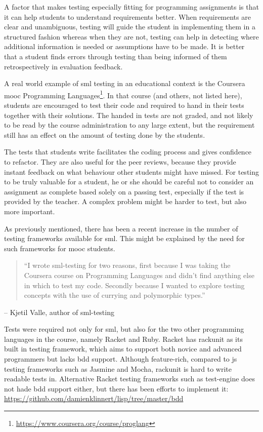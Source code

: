 \documentclass[11pt]{article}
\begin{document}
A factor that makes testing especially fitting for programming assignments is that it can help students to understand requirements better.
When requirements are clear and unambiguous, testing will guide the student in implementing them in a structured fashion whereas when they are not, testing can help in detecting where additional information is needed or assumptions have to be made.
It is better that a student finds errors through testing than being informed of them retrospectively in evaluation feedback.

A real world example of \gls{sml} \gls{testing} in an educational context is the Coursera \gls{mooc} Programming Languages\footnote{\url{https://www.coursera.org/course/proglang}}.
In that course (and others, not listed here), students are encouraged to test their code and required to hand in their tests together with their solutions.
The handed in tests are not graded, and not likely to be read by the course administration to any large extent, but the requirement still has an effect on the amount of testing done by the students.

The tests that students write facilitates the coding process and gives confidence to refactor.
They are also useful for the peer reviews, because they provide instant feedback on what behaviour other students might have missed.
For testing to be truly valuable for a student, he or she should be careful not to consider an assignment as complete based solely on a passing test, especially if the test is provided by the teacher.
A complex problem might be harder to test, but also more important.

As previously mentioned, there has been a recent increase in the number of testing frameworks available for \gls{sml}. This might be explained by the need for such frameworks for \gls{mooc} students.

\begin{quote}
``I wrote sml-testing for two reasons, first because I was taking the Coursera course on Programming Languages and didn't find anything else in which to test my code. Secondly because I wanted to explore testing concepts with the use of currying and polymorphic types.''
\end{quote}

-- Kjetil Valle, author of sml-testing

Tests were required not only for \gls{sml}, but also for the two other programming languages in the course, namely Racket and Ruby.
Racket has rackunit as its built in testing framework, which aims to support both novice and advanced programmers but lacks \gls{bdd} support.
Although feature-rich, compared to \gls{js} testing frameworks such as Jasmine and Mocha, rackunit is hard to write readable tests in.
Alternative Racket testing frameworks such as test-engine does not hade \gls{bdd} support either, but there has been efforts to implement it: \url{https://github.com/damienklinnert/lisp/tree/master/bdd}
\end{document}
